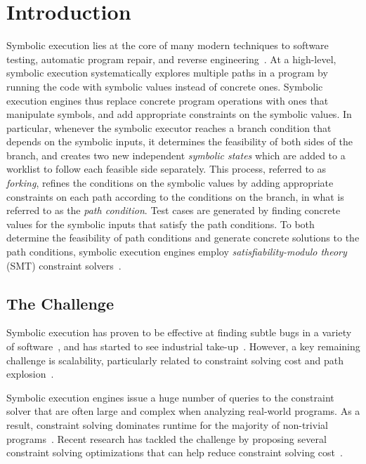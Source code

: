 
\chapter{Introduction}\label{chapter:introduction}

Symbolic execution lies at the core of many modern techniques to
software testing, automatic program repair, and reverse
engineering~\cite{dart,cute,klee,semfix,chipounov2010reverse,JPF-SE}. At
a high-level, symbolic execution systematically explores multiple
paths in a program by running the code with symbolic values instead of
concrete ones. Symbolic execution engines thus replace concrete
program operations with ones that manipulate symbols, and add
appropriate constraints on the symbolic values. In particular,
whenever the symbolic executor reaches a branch condition that depends
on the symbolic inputs, it determines the feasibility of both sides of
the branch, and creates two new independent \emph{symbolic states}
which are added to a worklist to follow each feasible side
separately. This process, referred to as \emph{forking}, refines the
conditions on the symbolic values by adding appropriate constraints on
each path according to the conditions on the branch, in what is
referred to as the \textit{path condition}.  Test cases are generated
by finding concrete values for the symbolic inputs that satisfy the
path conditions.  To both determine the feasibility of path conditions
and generate concrete solutions to the path conditions, symbolic
execution engines employ \emph{satisfiability-modulo theory} (SMT)
constraint solvers~\cite{smt:cacm11}.

\section{The Challenge}
Symbolic execution has proven to be effective at finding subtle bugs
in a variety of software~\cite{klee,exe,JPF-SE,pex,sage}, and has
started to see industrial
take-up~\cite{symex-impact-11,sage,mayhem12}. However, a key remaining
challenge is scalability, particularly related to constraint solving
cost and path explosion~\cite{symex:cacm}.

Symbolic execution engines issue a huge number of queries to the
constraint solver that are often large and complex when analyzing
real-world programs. As a result, constraint solving dominates runtime
for the majority of non-trivial
programs~\cite{klee-multisolver,incremental-smt:hvc14}. Recent
research has tackled the challenge by proposing several constraint
solving optimizations that can help reduce constraint solving
cost~\cite{exe,cute,constraint-opt:cstva11,memoized:symex,
  green,greentrie,recal,klee-multisolver,klee-array}.

